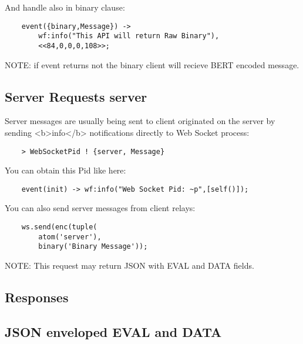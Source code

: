And handle also in binary clause:

\vspace{1\baselineskip}
\begin{lstlisting}
    event({binary,Message}) ->
        wf:info("This API will return Raw Binary"),
        <<84,0,0,0,108>>;
\end{lstlisting}
\vspace{1\baselineskip}

NOTE: if event returns not the binary client will recieve BERT encoded message.

\newpage
\subsection{Server Requests {\bf server}}

Server messages are usually being sent to client originated on the
server by sending <b>info</b> notifications directly to Web Socket process:

\vspace{1\baselineskip}
\begin{lstlisting}
    > WebSocketPid ! {server, Message}
\end{lstlisting}
\vspace{1\baselineskip}

You can obtain this Pid like here:

\vspace{1\baselineskip}
\begin{lstlisting}
    event(init) -> wf:info("Web Socket Pid: ~p",[self()]);
\end{lstlisting}
\vspace{1\baselineskip}

You can also send server messages from client relays:

\vspace{1\baselineskip}
\begin{lstlisting}
    ws.send(enc(tuple(
        atom('server'),
        binary('Binary Message'));
\end{lstlisting}
\vspace{1\baselineskip}

NOTE: This request may return JSON with EVAL and DATA fields.

\newpage
\subsection*{Responses}

\subsection{JSON enveloped EVAL and DATA}

